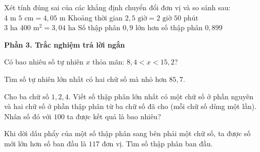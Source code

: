 \begin{ex} %
Xét tính đúng sai của các khẳng định chuyển đổi đơn vị và so sánh sau:
\choiceTF
{\True $4\text{ m }5\text{ cm} = 4{,}05\text{ m}$}
{Khoảng thời gian $2{,}5\text{ giờ} = 2\text{ giờ }50\text{ phút}$}
{\True $3\text{ ha }400\text{ m}^2 = 3{,}04\text{ ha}$}
{\True Số thập phân $0{,}9$ lớn hơn số thập phân $0{,}899$}
\end{ex}

\textbf{Phần 3. Trắc nghiệm trả lời ngắn}

\begin{ex} %
Có bao nhiêu số tự nhiên $x$ thỏa mãn: $8{,}4 < x < 15{,}2$?
\end{ex}

\begin{ex} %
Tìm số tự nhiên lớn nhất có hai chữ số mà nhỏ hơn $85{,}7$.
\end{ex}

\begin{ex} %
Cho ba chữ số $1, 2, 4$. Viết số thập phân lớn nhất có một chữ số ở phần nguyên và hai chữ số ở phần thập phân từ ba chữ số đã cho (mỗi chữ số dùng một lần). Nhân số đó với $100$ ta được kết quả là bao nhiêu?
\end{ex}

\begin{ex} %
Khi dời dấu phẩy của một số thập phân sang bên phải một chữ số, ta được số mới lớn hơn số ban đầu là $117$ đơn vị. Tìm số thập phân ban đầu.
\end{ex}

